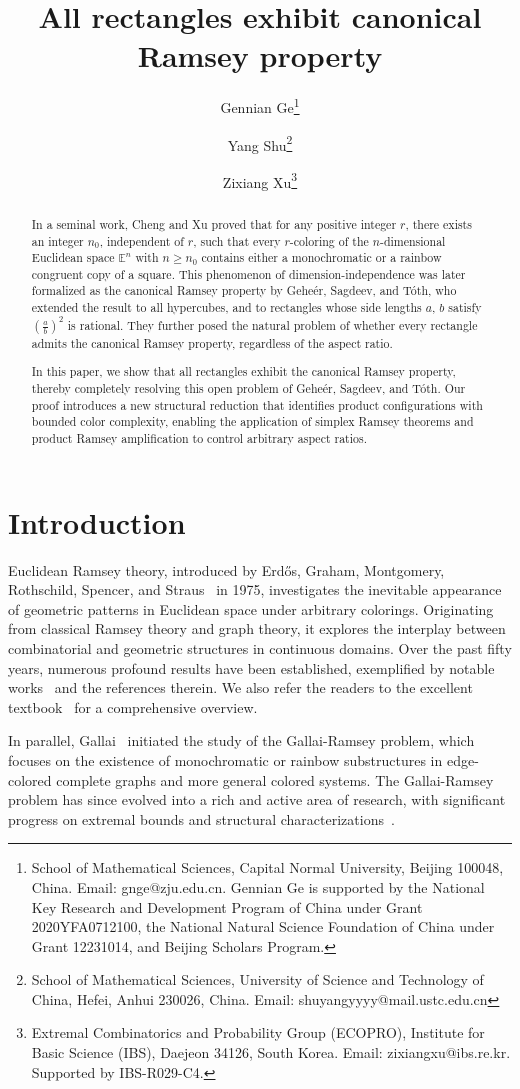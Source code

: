 \documentclass[11pt]{article}
\title{All rectangles exhibit canonical Ramsey property}
\author{
Gennian Ge\thanks{School of Mathematical Sciences, Capital Normal University, Beijing 100048, China. Email: gnge@zju.edu.cn. Gennian Ge is supported by the National Key Research and Development Program of China under Grant 2020YFA0712100, the National Natural Science Foundation of China under Grant 12231014, and Beijing Scholars Program.}
\and 
Yang Shu\thanks{School of Mathematical Sciences, University of Science and Technology of China, Hefei, Anhui 230026, China. Email: shuyangyyyy@mail.ustc.edu.cn}
\and
Zixiang Xu\thanks{Extremal Combinatorics and Probability Group (ECOPRO), Institute for Basic Science (IBS), Daejeon 34126, South Korea. Email: zixiangxu@ibs.re.kr. Supported by IBS-R029-C4.}
}
\date{}
\theoremstyle{definition}
\begin{document}
\maketitle

\begin{abstract}

In a seminal work, Cheng and Xu proved that for any positive integer \(r\), there exists an integer \(n_0\), independent of \(r\), such that every \(r\)-coloring of the \(n\)-dimensional Euclidean space \(\mathbb{E}^n\) with \(n \ge n_0\) contains either a monochromatic or a rainbow congruent copy of a square. This phenomenon of dimension-independence was later formalized as the canonical Ramsey property by Gehe\'{e}r, Sagdeev, and T\'{o}th, who extended the result to all hypercubes, and to rectangles whose side lengths \(a\), \(b\) satisfy \((\frac{a}{b})^2\) is rational. They further posed the natural problem of whether every rectangle admits the canonical Ramsey property, regardless of the aspect ratio.

In this paper, we show that all rectangles exhibit the canonical Ramsey property, thereby completely resolving this open problem of Gehe\'{e}r, Sagdeev, and T\'{o}th. Our proof introduces a new structural reduction that identifies product configurations with bounded color complexity, enabling the application of simplex Ramsey theorems and product Ramsey amplification to control arbitrary aspect ratios.
\end{abstract}

\section{Introduction}

Euclidean Ramsey theory, introduced by Erd\H{o}s, Graham, Montgomery, Rothschild, Spencer, and Straus~\cite{1973JCTA} in 1975, investigates the inevitable appearance of geometric patterns in Euclidean space under arbitrary colorings. Originating from classical Ramsey theory and graph theory, it explores the interplay between combinatorial and geometric structures in continuous domains. Over the past fifty years, numerous profound results have been established, exemplified by notable works~\cite{2019DCGCONLON,conlon2022more,2024Yip,2026JCTA,1990JAMS,2004FranklRodl,2025EUJC,1980GrahamJCTA,2009Combinatorica,SHADER1976385} and the references therein. We also refer the readers to the excellent textbook~\cite{1997HANDBOOK} for a comprehensive overview.

In parallel, Gallai~\cite{1967Gallai} initiated the study of the Gallai-Ramsey problem, which focuses on the existence of monochromatic or rainbow substructures in edge-colored complete graphs and more general colored systems. The Gallai-Ramsey problem has since evolved into a rich and active area of research, with significant progress on extremal bounds and structural characterizations~\cite{2020SIDMABalogh,2010JGTGyarfas,2020JGTLiu}.
\end{document}
